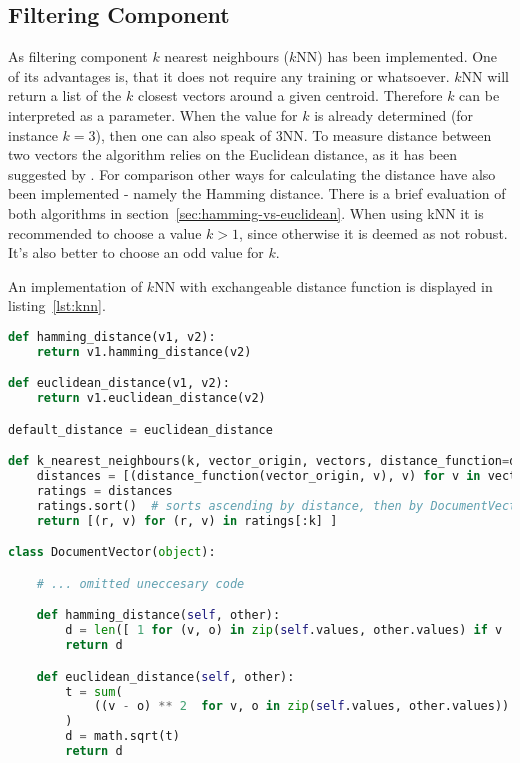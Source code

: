 
\subsection{Filtering Component}
\label{sec:filtering-component}
As filtering component $k$ nearest neighbours ($k$NN) has been implemented.
One of its advantages is, that it does not require any training or whatsoever.\citep[p.~290]{manning:2009}
$k$NN will return a list of the $k$ closest vectors around a given centroid.
Therefore $k$ can be interpreted as a parameter.
When the value for $k$ is already determined (for instance $k=3$), then one can also speak of 3NN.\citep[p.~297-298]{manning:2009}
To measure distance between two vectors the algorithm relies on the Euclidean distance, as it has been suggested by \citeauthor{manning:2009}.\citep[p.~292]{manning:2009}
For comparison other ways for calculating the distance have also been implemented - namely the Hamming distance.
There is a brief evaluation of both algorithms in section~\ref{sec:hamming-vs-euclidean}.
When using kNN it is recommended to choose a value $k > 1$, since otherwise it is deemed as not robust.
It's also better to choose an odd value for $k$.

An implementation of $k$NN with exchangeable distance function is displayed in listing~\ref{lst:knn}.

\begin{lstlisting}[language=Python,caption={$k$NN and distance methods},label={lst:knn},float=h]
def hamming_distance(v1, v2):
    return v1.hamming_distance(v2)

def euclidean_distance(v1, v2):
    return v1.euclidean_distance(v2)

default_distance = euclidean_distance

def k_nearest_neighbours(k, vector_origin, vectors, distance_function=default_distance):
    distances = [(distance_function(vector_origin, v), v) for v in vectors]
    ratings = distances
    ratings.sort()  # sorts ascending by distance, then by DocumentVector
    return [(r, v) for (r, v) in ratings[:k] ]

class DocumentVector(object):

    # ... omitted uneccesary code

    def hamming_distance(self, other):
        d = len([ 1 for (v, o) in zip(self.values, other.values) if v != o ])
        return d

    def euclidean_distance(self, other):
        t = sum(
            ((v - o) ** 2  for v, o in zip(self.values, other.values))
        )
        d = math.sqrt(t)
        return d
\end{lstlisting}


